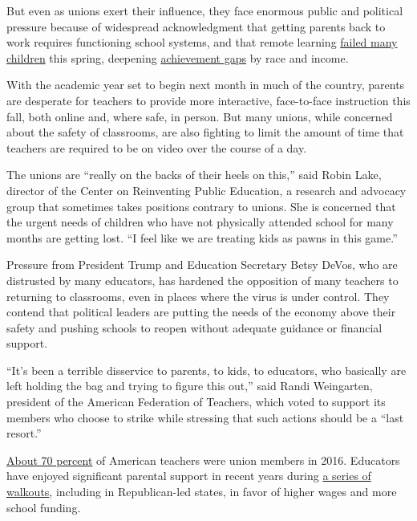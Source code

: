 But even as unions exert their influence, they face enormous public and
political pressure because of widespread acknowledgment that getting
parents back to work requires functioning school systems, and that
remote learning
\href{https://www.nytimes3xbfgragh.onion/2020/06/05/us/coronavirus-education-lost-learning.html}{failed
many children} this spring, deepening
\href{https://www.nytimes3xbfgragh.onion/2020/06/05/us/coronavirus-education-lost-learning.html}{achievement
gaps} by race and income.

With the academic year set to begin next month in much of the country,
parents are desperate for teachers to provide more interactive,
face-to-face instruction this fall, both online and, where safe, in
person. But many unions, while concerned about the safety of classrooms,
are also fighting to limit the amount of time that teachers are required
to be on video over the course of a day.

The unions are ``really on the backs of their heels on this,'' said
Robin Lake, director of the Center on Reinventing Public Education, a
research and advocacy group that sometimes takes positions contrary to
unions. She is concerned that the urgent needs of children who have not
physically attended school for many months are getting lost. ``I feel
like we are treating kids as pawns in this game.''

Pressure from President Trump and Education Secretary Betsy DeVos, who
are distrusted by many educators, has hardened the opposition of many
teachers to returning to classrooms, even in places where the virus is
under control. They contend that political leaders are putting the needs
of the economy above their safety and pushing schools to reopen without
adequate guidance or financial support.

``It's been a terrible disservice to parents, to kids, to educators, who
basically are left holding the bag and trying to figure this out,'' said
Randi Weingarten, president of the American Federation of Teachers,
which voted to support its members who choose to strike while stressing
that such actions should be a ``last resort.''

\href{https://nces.ed.gov/surveys/ntps/tables/Table_TeachersUnion.asp}{About
70 percent} of American teachers were union members in 2016. Educators
have enjoyed significant parental support in recent years during
\href{https://www.nytimes3xbfgragh.onion/2019/01/14/us/lausd-teachers-strike.html}{a
series of walkouts}, including in Republican-led states, in favor of
higher wages and more school funding.

